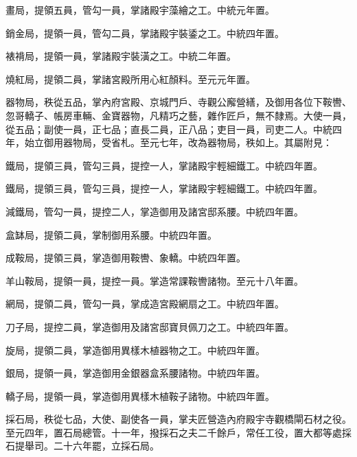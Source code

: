 \begin{pinyinscope}
 畫局，提領五員，管勾一員，掌諸殿宇藻繪之工。中統元年置。



 銷金局，提領一員，管勾二員，掌諸殿宇裝鋈之工。中統四年置。



 裱褙局，提領一員，掌諸殿宇裝潢之工。中統二年置。



 燒紅局，提領二員，掌諸宮殿所用心紅顏料。至元元年置。



 器物局，秩從五品，掌內府宮殿、京城門戶、寺觀公廨營繕，及御用各位下鞍轡、忽哥轎子、帳房車輛、金寶器物，凡精巧之藝，雜作匠戶，無不隸焉。大使一員，從五品；副使一員，正七品；直長二員，正八品；吏目一員，司吏二人。中統四年，始立御用器物局，受省札。至元七年，改為器物局，秩如上。其屬附見：



 鐵局，提領三員，管勾三員，提控一人，掌諸殿宇輕細鐵工。中統四年置。



 鐵局，提領三員，管勾三員，提控一人，掌諸殿宇輕細鐵工。中統四年置。



 減鐵局，管勾一員，提控二人，掌造御用及諸宮邸系腰。中統四年置。



 盒缽局，提領二員，掌制御用系腰。中統四年置。



 成鞍局，提領三員，掌造御用鞍轡、象轎。中統四年置。



 羊山鞍局，提領一員，提控一員。掌造常課鞍轡諸物。至元十八年置。



 網局，提領二員，管勾一員，掌成造宮殿網扇之工。中統四年置。



 刀子局，提控二員，掌造御用及諸宮邸寶貝佩刀之工。中統四年置。



 旋局，提領二員，掌造御用異樣木植器物之工。中統四年置。



 銀局，提領一員，掌造御用金銀器盒系腰諸物。中統四年置。



 轎子局，提領一員，掌造御用異樣木植鞍子諸物。中統四年置。



 採石局，秩從七品，大使、副使各一員，掌夫匠營造內府殿宇寺觀橋閘石材之役。至元四年，置石局總管。十一年，撥採石之夫二千餘戶，常任工役，置大都等處採石提舉司。二十六年罷，立採石局。




\end{pinyinscope}
